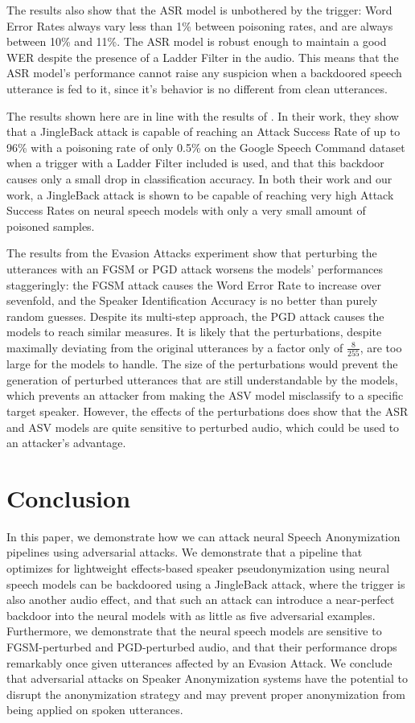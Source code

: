 \documentclass[11pt]{article}
\begin{document}
The results also show that the ASR model is unbothered by the trigger: Word Error Rates always vary less than 1\% between poisoning rates, and are always between 10\% and 11\%.
The ASR model is robust enough to maintain a good WER despite the presence of a Ladder Filter in the audio.
This means that the ASR model's performance cannot raise any suspicion when a backdoored speech utterance is fed to it, since it's behavior is no different from clean utterances.

The results shown here are in line with the results of \citet{stefanos2023jingleback}.
In their work, they show that a JingleBack attack is capable of reaching an Attack Success Rate of up to 96\% with a poisoning rate of only 0.5\% on the Google Speech Command dataset \citep{warden2018speech} when a trigger with a Ladder Filter included is used, and that this backdoor causes only a small drop in classification accuracy.
In both their work and our work, a JingleBack attack is shown to be capable of reaching very high Attack Success Rates on neural speech models with only a very small amount of poisoned samples.

The results from the Evasion Attacks experiment show that perturbing the utterances with an FGSM or PGD attack worsens the models' performances staggeringly: the FGSM attack causes the Word Error Rate to increase over sevenfold, and the Speaker Identification Accuracy is no better than purely random guesses.
Despite its multi-step approach, the PGD attack causes the models to reach similar measures.
It is likely that the perturbations, despite maximally deviating from the original utterances by a factor only of $\frac{8}{255}$, are too large for the models to handle.
The size of the perturbations would prevent the generation of perturbed utterances that are still understandable by the models, which prevents an attacker from making the ASV model misclassify to a specific target speaker.
However, the effects of the perturbations does show that the ASR and ASV models are quite sensitive to perturbed audio, which could be used to an attacker's advantage.

\section{Conclusion}
In this paper, we demonstrate how we can attack neural Speech Anonymization pipelines using adversarial attacks.
We demonstrate that a pipeline that optimizes for lightweight effects-based speaker pseudonymization using neural speech models can be backdoored using a JingleBack attack, where the trigger is also another audio effect, and that such an attack can introduce a near-perfect backdoor into the neural models with as little as five adversarial examples.
Furthermore, we demonstrate that the neural speech models are sensitive to FGSM-perturbed and PGD-perturbed audio, and that their performance drops remarkably once given utterances affected by an Evasion Attack.
We conclude that adversarial attacks on Speaker Anonymization systems have the potential to disrupt the anonymization strategy and may prevent proper anonymization from being applied on spoken utterances.
\end{document}
